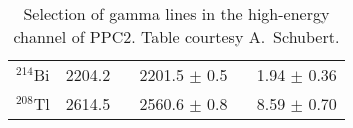 \begin{table}
\begin{tabular}{  c | r | r | c  }
					$^{214}$Bi     & 2204.2    ~ & 2201.5     ${\pm}$ 0.5       ~ & 1.94       ${\pm}$ 0.36       \\
					$^{208}$Tl    & 2614.5    ~ & 2560.6     ${\pm}$ 0.8       ~ & 8.59       ${\pm}$ 0.70       \\
					\hline
					\end{tabular}

				
					\caption[Selection of gamma lines in the high-energy channel of PPC2]
					{Selection of gamma lines in the high-energy channel of PPC2.  Table courtesy A.~Schubert.}
					\label{tab:PPC2HighEnergyGammaLines}
				\end{table}
	
